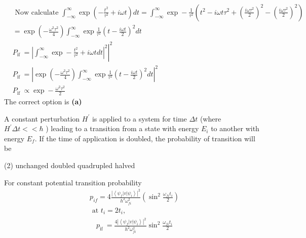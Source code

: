 \begin{enumerate}
\begin{answer}
$$\begin{aligned}
	\end{aligned}$$
	$$\begin{aligned}
	&\text { Now calculate } \int_{-\infty}^{\infty} \exp \left(-\frac{t^{2}}{\tau^{2}}+i \omega t\right) d t=\int_{-\infty}^{\infty} \exp -\frac{1}{\tau^{2}}\left(t^{2}-i \omega t \tau^{2}+\left(\frac{i \omega \tau^{2}}{2}\right)^{2}-\left(\frac{i \omega \tau^{2}}{2}\right)^{2}\right) \\
	&=\exp \left(-\frac{\omega^{2} \tau^{2}}{4}\right) \int_{-\infty}^{\infty} \exp \frac{1}{\tau^{2}}\left(t-\frac{i \omega t}{2}\right)^{2} d t \\
	&P_{\text {if }}=\left.\left|\int_{-\infty}^{\infty} \exp -\frac{t^{2}}{\tau^{2}}+i \omega t d t\right|^{2}\right|^{2} \\
	&P_{\text {if }}=\left|\exp \left(-\frac{\omega^{2} \tau^{2}}{4}\right) \int_{-\infty}^{\infty} \exp \frac{1}{\tau^{2}}\left(t-\frac{i \omega t}{2}\right)^{2} d t\right|^{2} \\
	&P_{\text {if }} \propto \exp -\frac{\omega^{2} \tau^{2}}{2}
	\end{aligned}$$
	The correct option is \textbf{(a)}
\end{answer}
\begin{minipage}{\textwidth}
	\item A constant perturbation $H^{\prime}$ is applied to a system for time $\Delta t$ (where $H^{\prime} \Delta t<<\hbar$ ) leading to a transition from a state with energy $E_{i}$ to another with energy $E_{f}$. If the time of application is doubled, the probability of transition will be
\end{minipage}
\begin{tasks}(2)
	\task[\textbf{A.}] unchanged
	\task[\textbf{B.}]doubled
	\task[\textbf{C.}]quadrupled
	\task[\textbf{D.}]halved
\end{tasks}
\begin{answer}
	For constant potential transition probability\\
	\begin{align*}
	&p_{i f}=4 \frac{\left|\left\langle\psi_{f}|v| \psi_{i}\right\rangle\right|^{2}}{h^{2} \omega_{f i}^{2}}\left(\sin ^{2} \frac{\omega_{f i} t_{i}}{2}\right) \\
	&\text { at } t_{i}=2 t_{i},
	\end{align*}
	\begin{align*}
	&p_{\text {if }}=\frac{4\left|\left\langle\psi_{f}|v| \psi_{i}\right\rangle\right|^{2}}{h^{2} \omega_{f i}^{2}} \sin ^{2} \frac{\omega_{f i} t_{i}}{2} \\

\end{align*}
\end{answer}
\end{enumerate}
